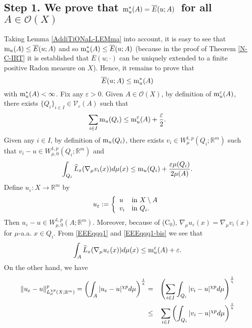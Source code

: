 \documentclass[10pt]{amsart}
\numberwithin{equation}{section}
\theoremstyle{definition}
\theoremstyle{remark}
\begin{document}
\subsection*{Step 1. We prove that \boldmath${\rm m}^*_u(A)=\overline{E}(u;A)$\unboldmath\ for all \boldmath$A\in\mathcal{O}(X)$\unboldmath}

Taking Lemma \ref{AddiTiONaL-LEMma} into account, it is easy to see that ${\rm m}_u(A)\leq\overline{E}(u;A)$ and so ${\rm m}^*_u(A)\leq \overline{E}(u;A)$ (because in the proof of Theorem \ref{N-C-IRT} it is established that $\overline{E}(u;\cdot)$ can be uniquely extended to a finite positive Radon measure on $X$). Hence, it remains to prove that
\begin{equation}\label{EEEEqqqq}
\overline{E}(u;A)\leq {\rm m}^*_u(A)
\end{equation}
with ${\rm m}^*_u(A)<\infty$. Fix any ${\varepsilon}>0$. Given $A\in\mathcal{O}(X)$, by definition of ${\rm m}^{\varepsilon}_u(A)$, there exists $\{Q_{i}\}_{i\in I}\in\mathcal{V}_{\varepsilon}(A)$  such that 
\begin{equation}\label{EEEqqq1}
\sum_{i\in I}{\rm m}_u(Q_{i})\leq {\rm m}^{\varepsilon}_u(A)+{{\varepsilon}\over 2}.
\end{equation}
Given any $i\in I$, by definition of ${\rm m}_u(Q_i)$, there exists $v_i\in W^{1,p}_{\mu}(Q_{i};{{\mathbb R}}^m)$ such that $v_i-u\in W^{1,p}_{\mu,0}(Q_{i};{{\mathbb R}}^m)$ and
\begin{equation}\label{EEEqqq1-bis}
\int_{Q_i}\widehat{L}_x(\nabla_\mu v_i(x))d\mu(x)\leq {\rm m}_u(Q_i)+{{\varepsilon} \mu(Q_i)\over 2\mu(A)}.
\end{equation}
 Define $u_{\varepsilon}:X\to{{\mathbb R}}^m$ by 
$$
u_{\varepsilon}:=\left\{
\begin{array}{ll}
u&\hbox{in }X\setminus A\\
v_i&\hbox{in }Q_{i}.
\end{array}
\right.
$$
Then $u_{\varepsilon}-u\in W^{1,p}_{\mu,0}(A;{{\mathbb R}}^m)$. Moreover, because of (C$_0$), $\nabla_\mu u_{\varepsilon}(x)=\nabla_\mu v_i(x)$ for $\mu$-a.a. $x\in Q_i$. From \eqref{EEEqqq1} and \eqref{EEEqqq1-bis} we see that
\begin{equation}\label{EEEqqq0}
\int_A\widehat{L}_x(\nabla_\mu u_{\varepsilon}(x))d\mu(x)\leq {\rm m}^{\varepsilon}_u(A)+{\varepsilon}.
\end{equation}
On the other hand, we have
\begin{eqnarray*}
\|u_{\varepsilon}-u\|^{p}_{L^{\chi p}_\mu(X;{{\mathbb R}}^m)}=\left(\int_A|u_{\varepsilon}-u|^{\chi p}d\mu\right)^{1\over\chi}&=&\left(\sum_{i\in I}\int_{Q_{i}}|v_i-u|^{\chi p}d\mu\right)^{1\over\chi}\\
&\leq&\sum_{i\in I}\left(\int_{Q_{i}}|v_i-u|^{\chi p}d\mu\right)^{1\over\chi}
\end{eqnarray*}
\end{document}
